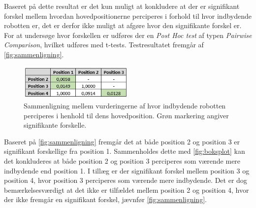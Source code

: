 Baseret på dette resultat er det kun muligt at konkludere at der er signifikant forskel mellem hvordan hovedpositionerne perciperes i forhold til hvor indbydende robotten er, det er derfor ikke muligt at afgøre hvor den signifikante forskel er. For at undersøge hvor forskellen er udføres der en \textit{Post Hoc test} af typen \textit{Pairwise Comparison}, hvilket udføres med t-tests. Testresultatet fremgår af \autoref{fig:sammenligning}.
%
\begin{figure}[H]
\centering
\includegraphics[width = 0.5\textwidth]{Figure/PostHocExcel.PNG} 
\caption{Sammenligning mellem vurderingerne af hvor indbydende robotten perciperes i henhold til dens hovedposition. Grøn markering angiver signifikante forskelle.}
\label{fig:sammenligning}
\end{figure}
\noindent
%
Baseret på \autoref{fig:sammenligning} fremgår det at både position 2 og position 3 er signifikant forskellige fra position 1. Sammenholdes dette med \autoref{fig:boksplot} kan det konkluderes at både position 2 og position 3 perciperes som værende mere indbydende end position 1. I tillæg er der signifikant forskel mellem position 3 og position 4, hvor position 3 perciperes som værende mere indbydende. Det er dog bemærkelsesværdigt at det ikke er tilfældet mellem position 2 og position 4, hvor der ikke fremgår en signifikant forskel, jævnfør \autoref{fig:sammenligning}.
%

